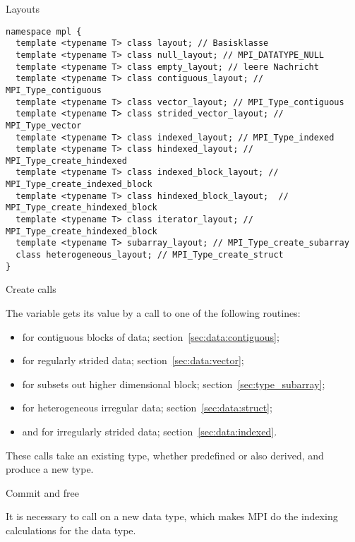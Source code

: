 \begin{mplnote}{Layouts}
  \begin{lstlisting}
namespace mpl {
  template <typename T> class layout; // Basisklasse
  template <typename T> class null_layout; // MPI_DATATYPE_NULL
  template <typename T> class empty_layout; // leere Nachricht
  template <typename T> class contiguous_layout; // MPI_Type_contiguous
  template <typename T> class vector_layout; // MPI_Type_contiguous
  template <typename T> class strided_vector_layout; // MPI_Type_vector
  template <typename T> class indexed_layout; // MPI_Type_indexed
  template <typename T> class hindexed_layout; // MPI_Type_create_hindexed
  template <typename T> class indexed_block_layout; // MPI_Type_create_indexed_block
  template <typename T> class hindexed_block_layout;  // MPI_Type_create_hindexed_block 
  template <typename T> class iterator_layout; // MPI_Type_create_hindexed_block 
  template <typename T> subarray_layout; // MPI_Type_create_subarray
  class heterogeneous_layout; // MPI_Type_create_struct
}
  \end{lstlisting}
\end{mplnote}

 {Create calls}

The  variable gets its value by a call to
one of the following routines:
\begin{itemize}
\item {} for contiguous blocks of
  data; section~\ref{sec:data:contiguous};
\item {} for regularly strided data;
  section~\ref{sec:data:vector};
\item {} for subsets out higher
  dimensional block; section~\ref{sec:type_subarray};
\item {} for heterogeneous irregular data;
  section~\ref{sec:data:struct};
\item {} and
   for irregularly strided data;
  section~\ref{sec:data:indexed}.
\end{itemize}
These calls take an existing type, whether predefined or also derived,
and produce a new type.

 {Commit and free}
\label{sec:mpi-type-commit-free}

It is necessary to call  on a new data
type, which makes MPI do the indexing calculations for the data type.

